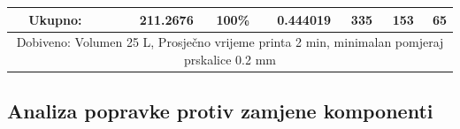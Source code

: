 \documentclass[12pt]{article}
\begin{document}
\begin{landscape}
\begin{table}[htbp]
\begin{tabular}{ccccccccc}
    \midrule
          & \multicolumn{1}{l}{Ukupno:} &       & \multicolumn{1}{r}{211.2676} & \multicolumn{1}{r}{100\%} & \multicolumn{1}{r}{0.444019} & \multicolumn{1}{r}{335} & \multicolumn{1}{r}{153} & \multicolumn{1}{r}{65} \\
    \midrule
    \multicolumn{9}{c}{Dobiveno: Volumen 25 L, Prosječno vrijeme printa 2 min, minimalan pomjeraj prskalice 0.2 mm} \\
    \bottomrule
    \end{tabular}%
  \label{tab:addlabel}%
\end{table}%

\end{landscape}
\subsection{Analiza popravke protiv zamjene komponenti}
\end{document}
